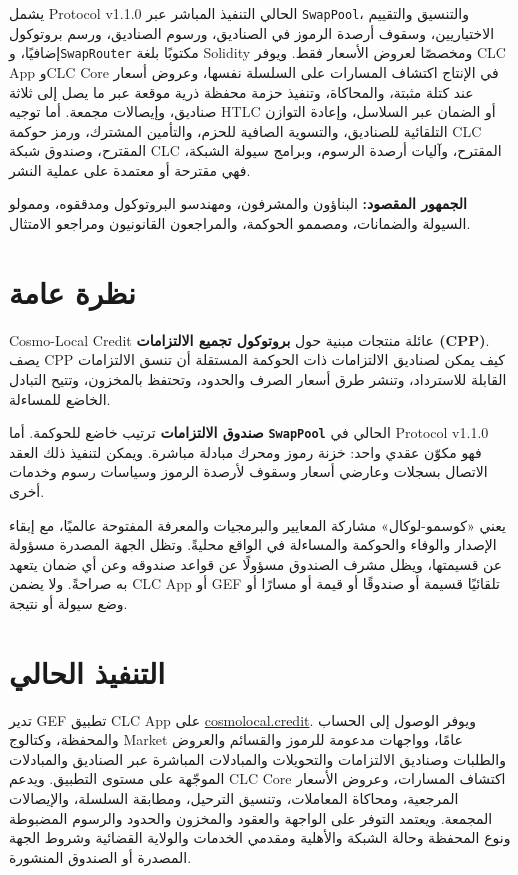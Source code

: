 \documentclass[11pt]{article}
\begin{document}
يشمل Protocol v1.1.0 الحالي التنفيذ المباشر عبر \texttt{SwapPool}، والتنسيق والتقييم الاختياريين، وسقوف أرصدة الرموز في الصناديق، ورسوم الصناديق، ورسم بروتوكول إضافيًا، و\texttt{SwapRouter} مكتوبًا بلغة Solidity ومخصصًا لعروض الأسعار فقط. ويوفر CLC App وCLC Core في الإنتاج اكتشاف المسارات على السلسلة نفسها، وعروض أسعار عند كتلة مثبتة، والمحاكاة، وتنفيذ حزمة محفظة ذرية موقعة عبر ما يصل إلى ثلاثة صناديق، وإيصالات مجمعة. أما توجيه HTLC أو الضمان عبر السلاسل، وإعادة التوازن التلقائية للصناديق، والتسوية الصافية للحزم، والتأمين المشترك، ورمز حوكمة CLC المقترح، وصندوق شبكة CLC المقترح، وآليات أرصدة الرسوم، وبرامج سيولة الشبكة، فهي مقترحة أو معتمدة على عملية النشر.

\textbf{الجمهور المقصود:} البناؤون والمشرفون، ومهندسو البروتوكول ومدققوه، وممولو السيولة والضمانات، ومصممو الحوكمة، والمراجعون القانونيون ومراجعو الامتثال.

\section*{نظرة عامة}

Cosmo-Local Credit عائلة منتجات مبنية حول \textbf{بروتوكول تجميع الالتزامات (CPP)}. يصف CPP كيف يمكن لصناديق الالتزامات ذات الحوكمة المستقلة أن تنسق الالتزامات القابلة للاسترداد، وتنشر طرق أسعار الصرف والحدود، وتحتفظ بالمخزون، وتتيح التبادل الخاضع للمساءلة.

\textbf{صندوق الالتزامات} ترتيب خاضع للحوكمة. أما \textbf{\texttt{SwapPool}} الحالي في Protocol v1.1.0 فهو مكوّن عقدي واحد: خزنة رموز ومحرك مبادلة مباشرة. ويمكن لتنفيذ ذلك العقد الاتصال بسجلات وعارضي أسعار وسقوف لأرصدة الرموز وسياسات رسوم وخدمات أخرى.

يعني «كوسمو-لوكال» مشاركة المعايير والبرمجيات والمعرفة المفتوحة عالميًا، مع إبقاء الإصدار والوفاء والحوكمة والمساءلة في الواقع محليةً. وتظل الجهة المصدرة مسؤولة عن قسيمتها، ويظل مشرف الصندوق مسؤولًا عن قواعد صندوقه وعن أي ضمان يتعهد به صراحةً. ولا يضمن CLC App أو GEF تلقائيًا قسيمة أو صندوقًا أو قيمة أو مسارًا أو وضع سيولة أو نتيجة.

\section*{التنفيذ الحالي}

تدير GEF تطبيق CLC App على \href{https://cosmolocal.credit}{cosmolocal.credit}. ويوفر الوصول إلى الحساب والمحفظة، وكتالوج Market عامًا، وواجهات مدعومة للرموز والقسائم والعروض والطلبات وصناديق الالتزامات والتحويلات والمبادلات المباشرة عبر الصناديق والمبادلات الموجّهة على مستوى التطبيق. ويدعم CLC Core اكتشاف المسارات، وعروض الأسعار المرجعية، ومحاكاة المعاملات، وتنسيق الترحيل، ومطابقة السلسلة، والإيصالات المجمعة. ويعتمد التوفر على الواجهة والعقود والمخزون والحدود والرسوم المضبوطة ونوع المحفظة وحالة الشبكة والأهلية ومقدمي الخدمات والولاية القضائية وشروط الجهة المصدرة أو الصندوق المنشورة.
\end{document}
